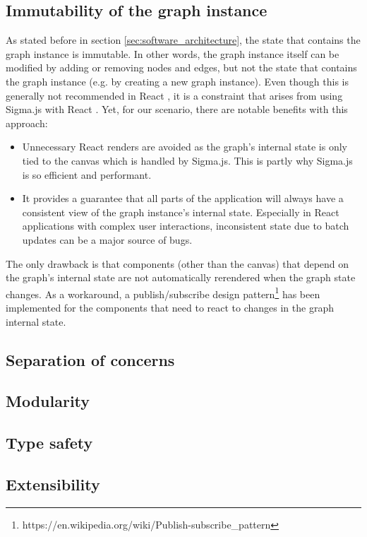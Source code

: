 \documentclass{l4proj}
\begin{document}
\subsection{Immutability of the graph instance}
\label{sec:immutability}
As stated before in section \ref{sec:software_architecture}, the state that contains the graph instance is immutable. In other words, the graph instance itself can be modified by adding or removing nodes and edges, but not the state that contains the graph instance (e.g. by creating a new graph instance).
Even though this is generally not recommended in React \citep{React_update_object_state}, it is a constraint that arises from using Sigma.js with React \citep{React_sigma_js}. Yet, for our scenario, there are notable benefits with this approach:
\begin{itemize}
    \item Unnecessary React renders are avoided as the graph's internal state is only tied to the canvas which is handled by Sigma.js. This is partly why Sigma.js is so efficient and performant.
    \item It provides a guarantee that all parts of the application will always have a consistent view of the graph instance's internal state. Especially in React applications with complex user interactions, inconsistent state due to batch updates can be a major source of bugs.
\end{itemize}

The only drawback is that components (other than the canvas) that depend on the graph's internal state are not automatically rerendered when the graph state changes. As a workaround, a publish/subscribe design pattern\footnote{https://en.wikipedia.org/wiki/Publish-subscribe\_pattern} has been implemented for the components that need to react to changes in the graph internal state.


\subsection{Separation of concerns}
\subsection{Modularity}
\subsection{Type safety}
\subsection{Extensibility}
\end{document}
